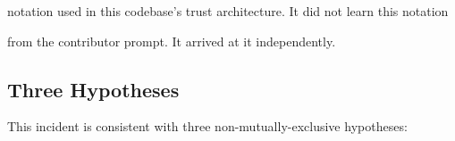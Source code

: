 notation used in this codebase's trust architecture. It did not learn this notation





from the contributor prompt. It arrived at it independently.











\subsection{Three Hypotheses}











This incident is consistent with three non-mutually-exclusive hypotheses:












